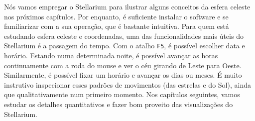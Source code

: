 Nós vamos empregar o Stellarium para ilustrar alguns conceitos da esfera celeste nos próximos capítulos. Por enquanto, é suficiente instalar o software e se familiarizar com a sua operação, que é bastante intuitiva. Para quem está estudando esfera celeste e coordenadas, uma das funcionalidades mais úteis do Stellarium é a passagem do tempo. Com o atalho \texttt{F5}, é possível escolher data e horário. Estando numa determinada noite, é possível avançar as horas continuamente com a roda do mouse e ver o céu girando de Leste para Oeste. Similarmente, é possível fixar um horário e avançar os dias ou meses. É muito instrutivo inspecionar esses padrões de movimentos (das estrelas e do Sol), ainda que qualitativamente num primeiro momento. Nos capítulos seguintes, vamos estudar os detalhes quantitativos e fazer bom proveito das visualizações do Stellarium.


